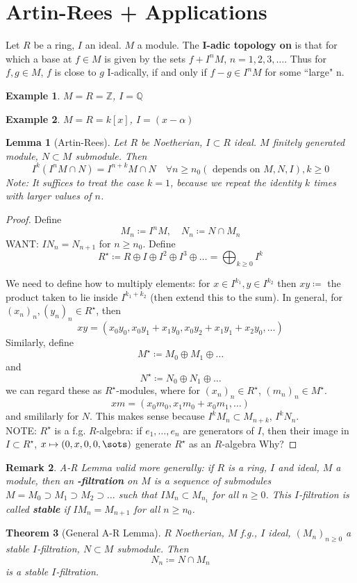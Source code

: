 \documentclass[12pt]{article}
\newcommand{\z}{\mathbb{Z}}
\newcommand{\q}{\mathbb{Q}}
\newtheorem{theorem}{Theorem}
\newtheorem{lemma}[theorem]{Lemma}
\newtheorem{remark}[theorem]{Remark}
\newtheorem*{eg}{Example}
\theoremstyle{definition}
\begin{document}
\section*{Artin-Rees + Applications}
Let $R$ be a ring, $I$ an ideal. $M$ a module. The \textbf{I-adic topology on } is that for which a base at $f\in M$ is given by the sets $f+ I^nM$, $n = 1,2,3,\dots$. Thus for $f,g\in M$, $f $ is close to $g$ I-adically, if and only if $f-g \in I^nM$ for some ``large" n.
\begin{eg}
$M=R=\z$, $I = \q$
\end{eg}
\begin{eg}
$M=R=k[x]$, $I = (x-\alpha)$
\end{eg}
\date{13.11.2018}
\begin{lemma}[Artin-Rees]
Let $R$ be Noetherian, $I\subset R$ ideal. $M$ finitely generated module, $N\subset M$ submodule. Then 
\[
I^k(I^nM \cap N) = I^{n+k}M\cap N\quad \forall n\geq n_0 (\text{ depends on $M,N,I$}),k\geq 0
\]
Note: It suffices to treat the case $k=1$, because we repeat the identity $k$ times with larger values of $n$.
\end{lemma}
\begin{proof}
Define
\[
M_n \coloneqq I^nM, \quad N_n \coloneqq N \cap M_n
\]
WANT: $IN_n = N_{n+1}$ for $n\geq n_0$. Define 
\[
R^\star \coloneqq R \oplus I \oplus I^2 \oplus I^3 \oplus \dots = \bigoplus_{k\geq 0} I^k
\]

We need to define how to multiply elements: for $x\in I^{k_1}, y\in I^{k_2}$ then $xy \coloneqq $ the product taken to lie inside $I^{k_1+k_2}$ (then extend this to the sum). In general, for $(x_n)_n, (y_n)_n \in R^\star$, then
\[
xy = (x_0y_0, x_0y_1+x_1y_0, x_0y_2+x_1y_1+x_2y_0, \dots)
\]
Similarly, define 
\[
M^\star \coloneqq M_0\oplus M_1 \oplus \dots
\]
and
\[
N^\star \coloneqq N_0\oplus N_1 \oplus \dots
\]
we can regard these as $R^\star $-modules, where for $(x_n)_n \in R^\star$, $(m_n)_n\in M^\star$. 
\[
xm = (x_0m_0, x_1m_0+x_0m_1, \dots)
\]
and smililarly for $N$. This makes sense because $I^k M_n \subset M_{n+k}$, $I^kN_n$. \\
NOTE: $R^\star$ is a f.g. $R$-algebra: if $e_1,\dots, e_n$ are generators of $I$, then their image in $I\subset R^\star$, $x \mapsto (0,x,0,0,\sots)$ generate $R^\star$ as an $R$-algebra Why?



\end{proof}
\begin{remark}
A-R Lemma valid more generally: if $R$ is a ring, $I$ and ideal, $M$ a module, then an \textbf{-filtration} on $M$ is a sequence of submodules $M = M_0 \supset M_1\supset M_2 \supset \dots$ such that $IM_n \subset M_{n_1}$ for all $n\geq 0$. This $I$-filtration is called \textbf{stable} if $IM_n = M_{n+1}$ for all $n\geq n_0$.
\end{remark}
\begin{theorem}[General A-R Lemma]
$R$ Noetherian, $M$ f.g., $I $ ideal, $(M_n)_{n\geq0}$ a stable $I$-filtration, $N\subset M$ submodule. Then
\[
N_n \coloneqq N\cap M_n
\]
is a stable $I$-filtration.
\end{theorem}
\end{document}
